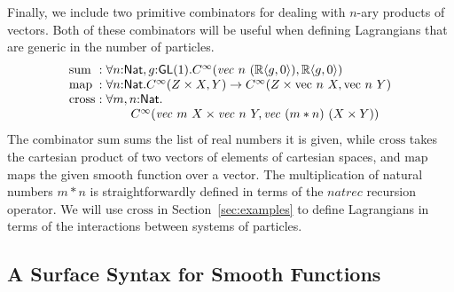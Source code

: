 \documentclass[preprint]{sigplanconf}
\theoremstyle{examplestyle}
\begin{document}
Finally, we include two primitive combinators for dealing with $n$-ary
products of vectors. Both of these combinators will be useful when
defining Lagrangians that are generic in the number of particles.
\begin{displaymath}
  \begin{array}{l@{\hspace{0.3em}}c@{\hspace{0.3em}}l}
    \mathrm{sum} &:& \forall n \mathord: \mathsf{Nat}, g \mathord: \mathsf{GL}(1). C^\infty(\mathit{vec}~n~(\mathbb{R}\langle g, 0 \rangle), \mathbb{R}\langle g, 0\rangle) \\
    \mathrm{map} &:& \forall n \mathord: \mathsf{Nat}. C^\infty(Z \times X,Y) \to C^\infty(Z \times \mathrm{vec}~n~X, \mathrm{vec}~n~Y) \\
    \mathrm{cross} &:& 
    \begin{array}[t]{@{}l}
      \forall m,n \mathord: \mathsf{Nat}.\\
      \quad\quad C^\infty(\mathit{vec}~m~X \times \mathit{vec}~n~Y, \mathit{vec}~(m*n)~(X \times Y))
    \end{array}
  \end{array}
\end{displaymath}
The combinator $\mathrm{sum}$ sums the list of real numbers it is
given, while $\mathrm{cross}$ takes the cartesian product of two
vectors of elements of cartesian spaces, and $\mathrm{map}$ maps the
given smooth function over a vector. The multiplication of natural
numbers $m*n$ is straightforwardly defined in terms of the
$\mathit{natrec}$ recursion operator. We will use $\mathrm{cross}$ in
Section~\ref{sec:examples} to define Lagrangians in terms of the
interactions between systems of particles.

\subsection{A Surface Syntax for Smooth Functions}
\label{sec:surface-syntax}
\end{document}
